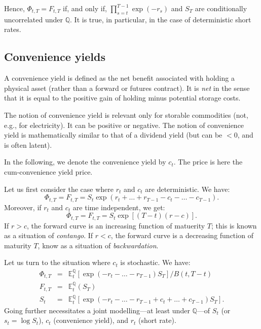\documentclass[
  12pt,
]{book}
\theoremstyle{definition}
\theoremstyle{definition}
\theoremstyle{definition}
\theoremstyle{definition}
\theoremstyle{remark}
\begin{document}
Hence, \(\Phi_{t,T} = F_{t,T}\) if, and only if, \(\prod^{T-1}_{s=t} \exp (-r_s)\) and \(S_T\) are conditionally uncorrelated under \(\mathbb{Q}\). It is true, in particular, in the case of deterministic short rates.

\hypertarget{FCFPConvenience}{%
\subsection{Convenience yields}\label{FCFPConvenience}}

A convenience yield is defined as the net benefit associated with holding a physical asset (rather than a forward or futures contract). It is \emph{net} in the sense that it is equal to the positive gain of holding minus potential storage costs.

The notion of convenience yield is relevant only for storable commodities (not, e.g., for electricity). It can be positive or negative. The notion of convenience yield is mathematically similar to that of a dividend yield (but can be \(<0\), and is often latent).

In the following, we denote the convenience yield by \(c_t\). The price is here the cum-convenience yield price.

Let us first consider the case where \(r_t\) and \(c_t\) are deterministic. We have:
\[
\Phi_{t,T} = F_{t,T} = S_t \exp (r_t + \ldots + r_{T-1} - c_t - \ldots - c_{T-1}).
\]
Moreover, if \(r_t\) and \(c_t\) are time independent, we get:
\[
\Phi_{t,T} = F_{t,T} = S_t \exp [(T-t)(r-c)].
\]
If \(r>c\), the forward curve is an increasing function of matuerity \(T\); this is known as a situation of \emph{contango}. If \(r<c\), the forward curve is a decreasing function of maturity \(T\), know as a situation of \emph{backwardation}.

Let us turn to the situation where \(c_t\) is stochastic. We have:
\begin{eqnarray}
\Phi_{t,T} &=& \mathbb{E}^{\mathbb{Q}}_t [\exp (-r_t - \ldots - r_{T-1}) S_T]/B(t,T-t) \label{eq:convenience1}\\
F_{t,T} &=& \mathbb{E}^{\mathbb{Q}}_t (S_T) \label{eq:convenience2}\\
S_t &=& \mathbb{E}^{\mathbb{Q}}_t [\exp (-r_t - \ldots - r_{T-1} + c_t + \ldots + c_{T-1}) S_T] \label{eq:convenience3}.
\end{eqnarray}
Going further necessitates a joint modelling---at least under \(\mathbb{Q}\)---of \(S_t\) (or \(s_t = \log S_t\)), \(c_t\) (convenience yield), and \(r_t\) (short rate).
\end{document}
